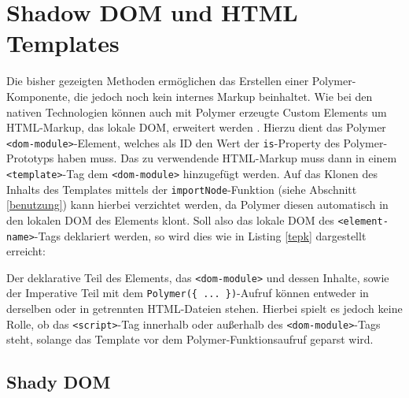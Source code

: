 \section{Shadow DOM und HTML Templates}\label{shadow-dom-und-html-templates}

Die bisher gezeigten Methoden ermöglichen das Erstellen einer Polymer-Komponente, die jedoch noch kein internes Markup beinhaltet. Wie bei den nativen Technologien können auch mit Polymer erzeugte Custom Elements um \ac{HTML}-Markup, das lokale \ac{DOM}, erweitert werden \cite{citeulike:13915080}. Hierzu dient das Polymer \texttt{\textless{}dom-module\textgreater{}}-Element, welches als ID den Wert der \texttt{is}-Property des Polymer-Prototyps haben muss. Das zu verwendende \ac{HTML}-Markup muss dann in einem \texttt{\textless{}template\textgreater{}}-Tag dem \texttt{\textless{}dom-module\textgreater{}} hinzugefügt werden. Auf das Klonen des Inhalts des Templates mittels der \texttt{importNode}-Funktion (siehe Abschnitt \ref{benutzung}) kann hierbei verzichtet werden, da Polymer diesen automatisch in den lokalen \ac{DOM} des Elements klont. Soll also das lokale \ac{DOM} des \texttt{\textless{}element-name\textgreater{}}-Tags deklariert werden, so wird dies wie in Listing \ref{tepk} dargestellt erreicht:



Der deklarative Teil des Elements, das \texttt{\textless{}dom-module\textgreater{}} und dessen Inhalte, sowie der Imperative Teil mit dem \texttt{Polymer(\{\ ...\ \})}-Aufruf können entweder in derselben oder in getrennten \ac{HTML}-Dateien stehen. Hierbei spielt es jedoch keine Rolle, ob das \texttt{\textless{}script\textgreater}-Tag innerhalb oder außerhalb des \texttt{\textless{}dom-module\textgreater{}}-Tags steht, solange das Template vor dem Polymer-Funktionsaufruf geparst wird.


\subsection{Shady DOM}\label{shady-dom}

